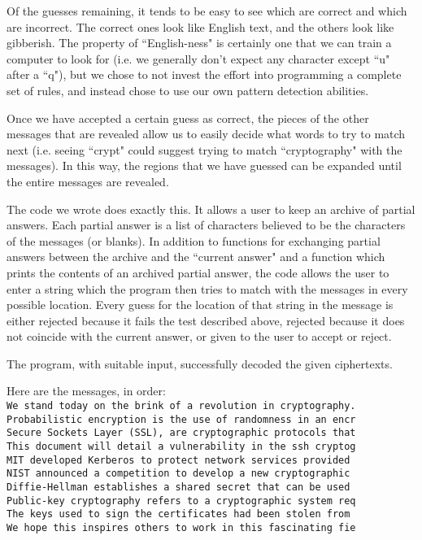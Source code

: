 \documentclass[11pt]{article}
\begin{document}
Of the guesses remaining, it tends to be easy to see which are correct and which are incorrect. The correct ones look like English text, and the others look like gibberish. The property of ``English-ness" is certainly one that we can train a computer to look for (i.e. we generally don't expect any character except ``u" after a ``q"), but we chose to not invest the effort into programming a complete set of rules, and instead chose to use our own pattern detection abilities. 

Once we have accepted a certain guess as correct, the pieces of the other messages that are revealed allow us to easily decide what words to try to match next (i.e. seeing ``crypt" could suggest trying to match ``cryptography" with the messages). In this way, the regions that we have guessed can be expanded until the entire messages are revealed. 

The code we wrote does exactly this. It allows a user to keep an archive of partial answers. Each partial answer is a list of characters believed to be the characters of the messages (or blanks). In addition to functions for exchanging partial answers between the archive and the ``current answer" and a function which prints the contents of an archived partial answer, the code allows the user to enter a string which the program then tries to match with the messages in every possible location. Every guess for the location of that string in the message is either rejected because it fails the test described above, rejected because it does not coincide with the current answer, or given to the user to accept or reject.

The program, with suitable input, successfully decoded the given ciphertexts.

Here are the messages, in order:\\
\texttt{We stand today on the brink of a revolution in cryptography.\\
Probabilistic encryption is the use of randomness in an encr\\
Secure Sockets Layer (SSL), are cryptographic protocols that\\
This document will detail a vulnerability in the ssh cryptog\\
MIT developed Kerberos to protect network services provided \\
NIST announced a competition to develop a new cryptographic \\
Diffie-Hellman establishes a shared secret that can be used \\
Public-key cryptography refers to a cryptographic system req\\
The keys used to sign the certificates had been stolen from \\
We hope this inspires others to work in this fascinating fie}
\end{document}

